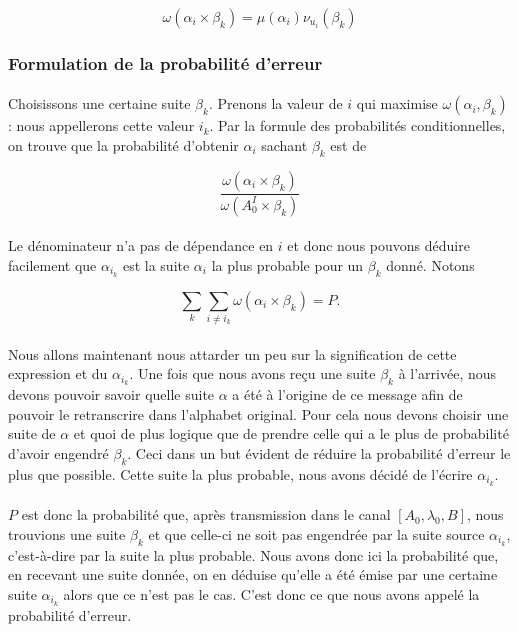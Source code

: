 	\[\omega(\alpha_i\times\beta_k)=\mu(\alpha_i)\nu_{u_i}(\beta_k)\]
	
\subsubsection*{Formulation de la probabilité d'erreur}
	
	\paragraph{}
	Choisissons une certaine suite $\beta_k$.
	Prenons la valeur de $i$ qui maximise $\omega(\alpha_i,\beta_k)$ : nous 
	appellerons cette valeur $i_k$. Par la formule des
	probabilités conditionnelles, on trouve que la probabilité d'obtenir
	$\alpha_i$ sachant $\beta_k$ est de 
	
	\[\frac{\omega(\alpha_i \times \beta_k)}{\omega(A_0^I \times \beta_k)}\]
	
	\paragraph{}
	Le dénominateur n'a pas de dépendance en $i$ et donc nous pouvons déduire 
	facilement que $\alpha_{i_k}$ est la suite $\alpha_i$ la plus probable 
	pour un $\beta_k$ donné. Notons
	
	\[\sum_k\sum_{i\neq i_k}\omega(\alpha_i \times \beta_k) = P.\]
	
	\paragraph{}
	Nous allons maintenant nous attarder un peu sur la signification de cette 
	expression et du $\alpha_{i_k}$. Une fois que nous avons reçu une suite
	$\beta_k$ à l'arrivée, nous devons pouvoir savoir quelle suite $\alpha$ 
	a été à l'origine de ce message afin de pouvoir le retranscrire dans 
	l'alphabet original. Pour cela nous devons choisir une suite de $\alpha$
	et quoi de plus logique que de prendre celle qui a le plus de probabilité 
	d'avoir engendré $\beta_k$. Ceci dans un but évident de réduire la 
	probabilité d'erreur le plus que possible. Cette suite la plus probable,
	nous avons décidé de l'écrire $\alpha_{i_k}$.
	
	\paragraph{}
	$P$ est donc la probabilité que, après transmission dans le canal 
	$[A_0,\lambda_0,B]$, nous trouvions une suite $\beta_k$ et que
	celle-ci ne soit pas engendrée par la suite source $\alpha_{i_k}$,
	c'est-à-dire par la suite la plus probable. Nous avons donc ici la
	probabilité que, en recevant une suite donnée, on en déduise
	qu'elle a été émise par une certaine suite $\alpha_{i_k}$ alors
	que ce n'est pas le cas. C'est donc ce que nous avons appelé la 
	probabilité d'erreur.
	
